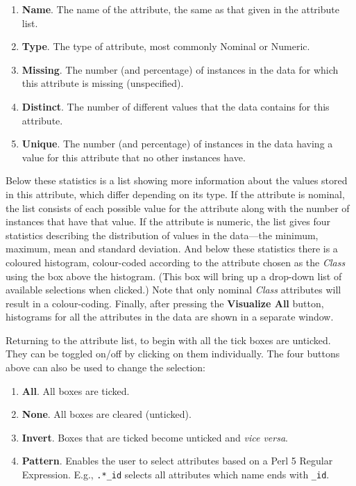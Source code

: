 \documentclass[a4paper]{article}
\begin{document}
\begin{enumerate}
\item \textbf{Name}.
The name of the attribute, the same as that given in the attribute list.
\item \textbf{Type}.
The type of attribute, most commonly Nominal or Numeric.
\item \textbf{Missing}.
The number (and percentage) of instances in the data for which this attribute
is missing (unspecified).
\item \textbf{Distinct}.
The number of different values that the data contains for this attribute.
\item \textbf{Unique}.
The number (and percentage) of instances in the data having a value for this
attribute that no other instances have.
\end{enumerate}
\noindent
Below these statistics is a list showing more information about the
values stored in this attribute, which differ depending on its type.
If the attribute is nominal, the list consists of each possible value
for the attribute along with the number of instances that have that
value.  If the attribute is numeric, the list gives four statistics
describing the distribution of values in the data---the minimum,
maximum, mean and standard deviation.  And below these statistics
there is a coloured histogram, colour-coded according to the attribute
chosen as the {\it Class} using the box above the histogram. (This box
will bring up a drop-down list of available selections when clicked.)
Note that only nominal {\it Class} attributes will result in a
colour-coding.  Finally, after pressing the \textbf{Visualize All}
button, histograms for all the attributes in the data are shown in a
separate window.

Returning to the attribute list, to begin with all the tick boxes are unticked.
They can be toggled on/off by clicking on them individually.  The four buttons
above can also be used to change the selection:

\begin{enumerate}
\item \textbf{All}.
All boxes are ticked.
\item \textbf{None}.
All boxes are cleared (unticked).
\item \textbf{Invert}.
Boxes that are ticked become unticked and {\em vice versa\/}.
\item \textbf{Pattern}.
Enables the user to select attributes based on a Perl 5 Regular Expression. E.g., 
\texttt{.*\_id} selects all attributes which name ends with \texttt{\_id}.
\end{enumerate}
\end{document}
